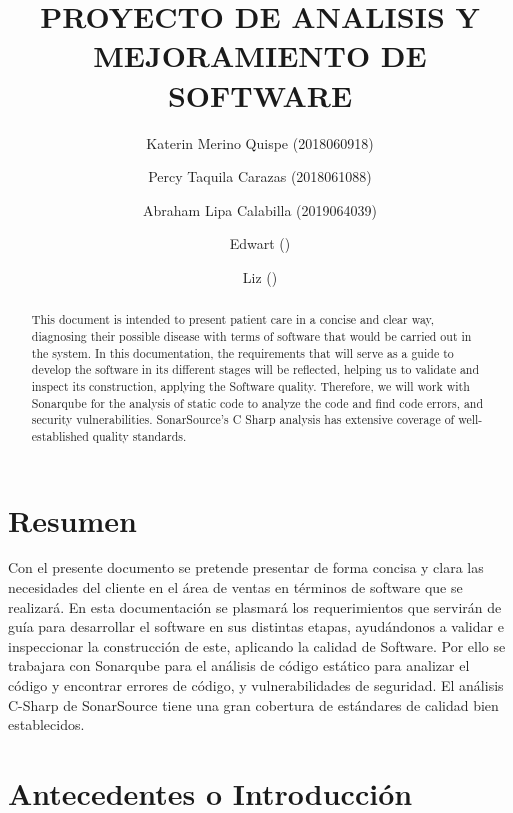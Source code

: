 \documentclass[preprint,12pt]{elsarticle}
\begin{document}
	
	\begin{frontmatter}

		\title{\huge  PROYECTO DE  ANALISIS Y  MEJORAMIENTO DE  SOFTWARE }
		\author{Katerin Merino Quispe              (2018060918)}
		\author{Percy Taquila Carazas             (2018061088)}
		\author{Abraham Lipa Calabilla (2019064039)}
		\author{Edwart                ()}
		\author{Liz                ()}
		\address{Tacna, Perú}
		


\begin{abstract}

This document is intended to present patient care in a concise and clear way, diagnosing their possible disease with terms of software that would be carried out in the system. In this documentation, the requirements that will serve as a guide to develop the software in its different stages will be reflected, helping us to validate and inspect its construction, applying the Software quality.
Therefore, we will work with Sonarqube for the analysis of static code to analyze the code and find code errors, and security vulnerabilities. SonarSource's C Sharp analysis has extensive coverage of well-established quality standards.

\end{abstract}

\end{frontmatter}

\section*{Resumen}

Con el presente documento se pretende presentar de forma concisa y clara las necesidades del cliente en el área de ventas en términos de software que se realizará. 
En esta documentación se plasmará los requerimientos que servirán de guía para desarrollar el software en sus distintas etapas, ayudándonos a validar e inspeccionar la construcción de este, aplicando la calidad de Software.
Por ello se trabajara con  Sonarqube para el análisis de código estático
para analizar el código y encontrar errores de código, y vulnerabilidades de seguridad. 
El análisis C-Sharp de SonarSource tiene una gran cobertura de estándares de calidad bien establecidos.

\section{Antecedentes o Introducción}
\end{document}
